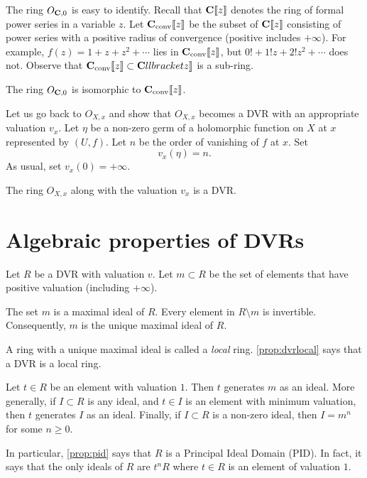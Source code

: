 \documentclass[12pt]{article}
\begin{document}
The ring $O_{{\bf C}, 0}$ is easy to identify.
Recall that ${\bf C}\llbracket z \rrbracket$ denotes the ring of formal power series in a variable $z$.
Let ${\bf C}_{\rm conv}\llbracket z \rrbracket$ be the subset of ${\bf C}\llbracket z \rrbracket$ consisting of power series with a positive radius of convergence (positive includes $+\infty$).
For example, $f(z) = 1 + z + z^2 + \cdots$ lies in ${\bf C}_{\rm conv} \llbracket z \rrbracket$, but $0! + 1! z + 2! z^2 + \cdots$ does not.
Observe that ${\bf C}_{\rm conv}\llbracket z \rrbracket \subset {\bf C} \\llbracket z \rrbracket$ is a sub-ring.
\begin{proposition}
  The ring $O_{{\bf C}, 0}$ is isomorphic to ${\bf C}_{\rm conv}\llbracket z \rrbracket$.
\end{proposition}

Let us go back to $O_{X,x}$ and show that $O_{X,x}$ becomes a DVR with an appropriate valuation $v_x$.
Let $\eta$ be a non-zero germ of a holomorphic function on $X$ at $x$ represented by $(U, f)$.
Let $n$ be the order of vanishing of $f$ at $x$.
Set
\[ v_x(\eta) = n.\]
As usual, set $v_x(0) = +\infty$.
\begin{proposition}
  The ring $O_{X,x}$ along with the valuation $v_x$ is a DVR.
\end{proposition}

\section{Algebraic properties of DVRs}
Let $R$ be a DVR with valuation $v$.
Let $m \subset R$ be the set of elements that have positive valuation (including $+\infty$).
\begin{proposition}\label{prop:dvrlocal}
  The set $m$ is a maximal ideal of $R$.
  Every element in $R \setminus m$ is invertible.
  Consequently, $m$ is the unique maximal ideal of $R$.
\end{proposition}
A ring with a unique maximal ideal is called a \emph{local} ring.
\autoref{prop:dvrlocal} says that a DVR is a local ring.

\begin{proposition}\label{prop:pid}
  Let $t \in R$ be an element with valuation $1$.
  Then $t$ generates $m$ as an ideal.
  More generally, if $I \subset R$ is any ideal, and $t \in I$ is an element with minimum valuation, then $t$ generates $I$ as an ideal.
  Finally, if $I \subset R$ is a non-zero ideal, then $I = m^n$ for some $n \geq 0$.
\end{proposition}
In particular, \autoref{prop:pid} says that $R$ is a Principal Ideal Domain (PID).
In fact, it says that the only ideals of $R$ are $t^nR$ where $t \in R$ is an element of valuation $1$.
\end{document}
